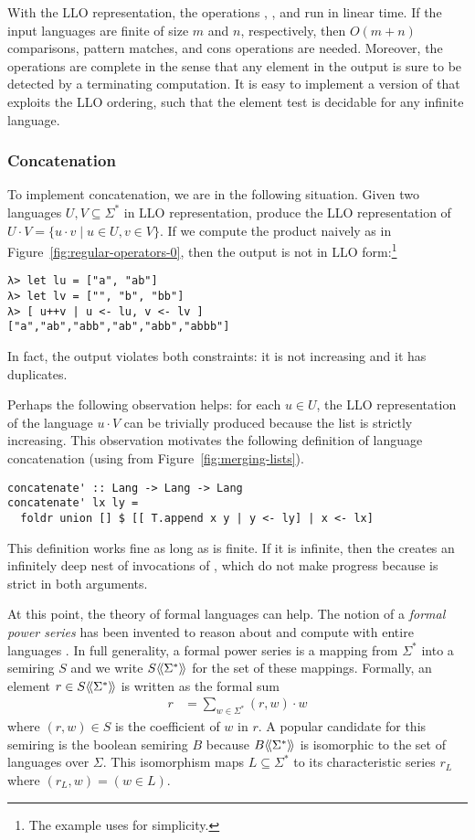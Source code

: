 With the LLO representation, the operations ,
, and  run in linear time. If the input languages
are finite of size $m$ and $n$, respectively, then $O(m+n)$
comparisons, pattern matches, and cons operations are needed.
Moreover, the operations are complete in the sense that any element in
the output is sure to be detected by a terminating computation. 
It is easy to implement a version of  that exploits the LLO ordering,
such that the element test is decidable for any infinite
language.



\subsubsection{Concatenation}
To implement concatenation, we are in the following situation. Given
two languages $U, V \subseteq \Sigma^*$ in LLO representation,
produce the LLO representation of $U \cdot V =  \{ u\cdot v \mid u\in
U, v\in V\}$. If we compute the product naively as in
Figure~\ref{fig:regular-operators-0}, then the output is not in LLO
form:\footnote{The example uses  for simplicity.}
\begin{verbatim}
λ> let lu = ["a", "ab"]
λ> let lv = ["", "b", "bb"]
λ> [ u++v | u <- lu, v <- lv ]
["a","ab","abb","ab","abb","abbb"]
\end{verbatim}
In fact, the output violates both constraints: it is not increasing
and it has duplicates.

Perhaps the following observation helps: for each $u\in U$, the LLO
representation of the language $u\cdot V$ can be trivially produced
because the list \code{[ u++v | v <- lv ]} is strictly
increasing. This observation motivates the following definition of
language concatenation (using  from Figure~\ref{fig:merging-lists}).
\begin{lstlisting}
concatenate' :: Lang -> Lang -> Lang
concatenate' lx ly =
  foldr union [] $ [[ T.append x y | y <- ly] | x <- lx]
\end{lstlisting}
This definition works fine as long as  is finite. If it is
infinite, then the  creates an infinitely deep nest of
invocations of , which do not make progress because
 is strict in both arguments.

At this point, the theory of formal languages can help. The notion of
a \emph{formal power series} has been invented to reason about and
compute with entire languages \cite{formal power series}. In full
generality, a formal power series is a mapping from $\Sigma^*$ into a
semiring $S$ and we write $S\langle\!\langle\Sigma^*\rangle\!\rangle$ for the set of these
mappings. Formally, an element $r \in S\langle\!\langle\Sigma^*\rangle\!\rangle$ is written as the
formal sum
\begin{align*}
  r &= \sum_{w \in \Sigma^*} (r,w) \cdot w
\end{align*}
where $(r,w) \in S$ is the coefficient of $w$ in $r$.
A popular candidate for this semiring is the boolean semiring $B$
because $B\langle\!\langle\Sigma^*\rangle\!\rangle$ is isomorphic to the set of languages over
$\Sigma$. This isomorphism maps $L\subseteq\Sigma^*$ to its
characteristic series $r_L$ where $(r_L, w) = (w \in L)$.

